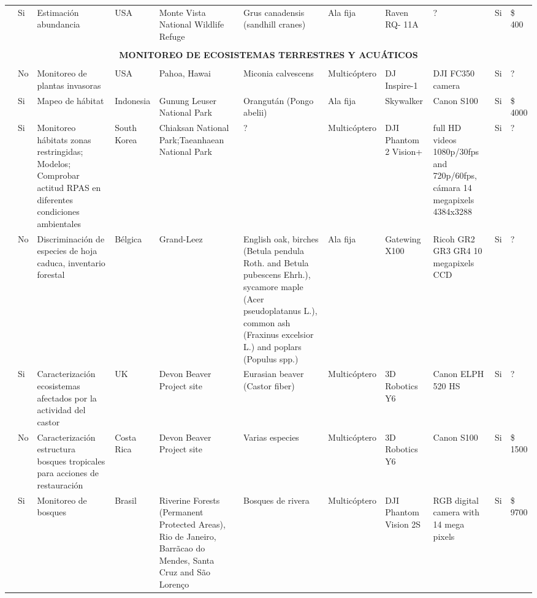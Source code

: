 \documentclass[onecolumn]{extarticle}
\begin{document}
\begin{landscape}
\begin{table}
\begin{tabular}{p{3cm}p{1.2cm}p{3cm}p{1cm}p{2cm}p{2cm}p{1cm}p{2cm}p{2cm}p{1cm}p{2cm}}
\cite{Christie2016}  &  Si & Estimación abundancia & USA &  Monte Vista National Wildlife Refuge & Grus canadensis (sandhill cranes)  & Ala fija & Raven RQ- 11A & ?  & Si & \$ 400 \\ 

\multicolumn{11}{c}{} \\
\multicolumn{11}{c}{{\bf  MONITOREO DE ECOSISTEMAS TERRESTRES Y ACUÁTICOS  }} \\
\multicolumn{11}{c}{} \\

\cite{Perroy2017}  & No & Monitoreo de plantas invasoras & USA & Pahoa, Hawai & Miconia calvescens & Multicóptero & DJ Inspire-1 & DJI FC350 camera  & Si & ?  \\ 

\cite{Szantoi2017}  & Si & Mapeo de hábitat & Indonesia & Gunung Leuser National Park & Orangután (Pongo abelii)  & Ala fija & Skywalker & Canon S100  & Si & \$ 4000 \\ 
  
\cite{Ivosevic2015}  & Si & Monitoreo hábitats zonas restringidas; Modelos; Comprobar actitud  RPAS en diferentes condiciones ambientales & South Korea & Chiaksan National Park;Taeanhaean National Park &  ? & Multicóptero & DJI Phantom 2 Vision+  & full HD videos 1080p/30fps and 720p/60fps, cámara 14 megapixels 4384x3288 & Si & ? \\ 
  
\cite{Lisein2015}  & No & Discriminación de especies de  hoja caduca, inventario forestal & Bélgica & Grand-Leez & English oak, birches (Betula pendula Roth. and Betula pubescens Ehrh.), sycamore maple (Acer pseudoplatanus L.), common ash (Fraxinus excelsior L.) and poplars (Populus spp.) & Ala fija & Gatewing X100  & Ricoh GR2 GR3 GR4 10 megapixels CCD  & Si & ?  \\ 
  
\cite{Puttock2015}  & Si & Caracterización ecosistemas afectados por la actividad del castor & UK & Devon Beaver Project site & Eurasian beaver (Castor fiber) & Multicóptero & 3D Robotics Y6 & Canon ELPH 520 HS  & Si & ?  \\ 
  
\cite{Zahawi2015}  & No & Caracterización estructura bosques tropicales para acciones de restauración & Costa Rica & Devon Beaver Project site & Varias especies & Multicóptero & 3D Robotics Y6 & Canon S100  & Si & \$ 1500 \\ 
  
\cite{Bustamante2015}  & Si &  Monitoreo de bosques & Brasil & Riverine Forests (Permanent Protected Areas), Rio de Janeiro, Barrãcao do Mendes, Santa Cruz and São Lorenço & Bosques de rivera & Multicóptero & DJI Phantom Vision 2S   & RGB digital camera with 14 mega pixels & Si & \$ 9700  \\ 
  

\end{tabular}
\end{table}
\end{landscape}
\end{document}
